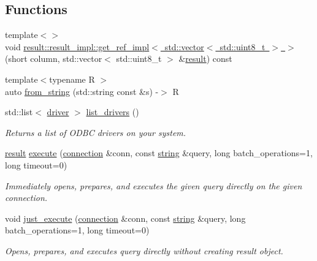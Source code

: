 \subsection*{Functions}
\begin{DoxyCompactItemize}
\item 
{\footnotesize template$<$$>$ }\\void \mbox{\hyperlink{namespacenanodbc_ae78e7fd9559120b2a9f51ad76668e5c2}{result\+::result\+\_\+impl\+::get\+\_\+ref\+\_\+impl$<$ std\+::vector$<$ std\+::uint8\+\_\+t $>$ $>$}} (short column, std\+::vector$<$ std\+::uint8\+\_\+t $>$ \&\mbox{\hyperlink{classnanodbc_1_1result}{result}}) const
\item 
{\footnotesize template$<$typename R $>$ }\\auto \mbox{\hyperlink{namespacenanodbc_a4cd107d8dff968512bfb806d7798a5f2}{from\+\_\+string}} (std\+::string const \&s) -\/$>$ R
\item 
std\+::list$<$ \mbox{\hyperlink{structnanodbc_1_1driver}{driver}} $>$ \mbox{\hyperlink{group__mainf_ga6f80fb8f7af3bb099e04bf8d603a210a}{list\+\_\+drivers}} ()
\begin{DoxyCompactList}\small\item\em Returns a list of O\+D\+BC drivers on your system. \end{DoxyCompactList}\item 
\mbox{\hyperlink{classnanodbc_1_1result}{result}} \mbox{\hyperlink{group__mainf_ga5cbac617a3964611bd16a2fc6f991b83}{execute}} (\mbox{\hyperlink{classnanodbc_1_1connection}{connection}} \&conn, const \mbox{\hyperlink{namespacenanodbc_abfc0ece56278e590911ec8352774c212}{string}} \&query, long batch\+\_\+operations=1, long timeout=0)
\begin{DoxyCompactList}\small\item\em Immediately opens, prepares, and executes the given query directly on the given connection. \end{DoxyCompactList}\item 
void \mbox{\hyperlink{group__mainf_gaee1775943fa1c5906cda9341851633c1}{just\+\_\+execute}} (\mbox{\hyperlink{classnanodbc_1_1connection}{connection}} \&conn, const \mbox{\hyperlink{namespacenanodbc_abfc0ece56278e590911ec8352774c212}{string}} \&query, long batch\+\_\+operations=1, long timeout=0)
\begin{DoxyCompactList}\small\item\em Opens, prepares, and executes query directly without creating result object. \end{DoxyCompactList}\item 

\end{DoxyCompactItemize}
